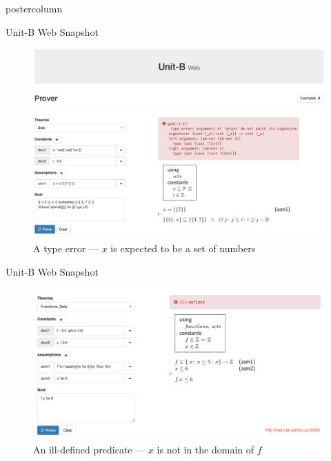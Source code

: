\documentclass{beamer}
\begin{document}
\begin{frame}
\begin{columns}
\begin{column}{.4\textwidth}
\begin{beamercolorbox}[center]{postercolumn}
\begin{minipage}{.98\textwidth}
{\begin{myblock}{Unit-B Web Snapshot}
            \begin{figure}
              \centering\includegraphics[width=\textwidth]{img/unitb-example1.png}
              \caption{A type error --- $x$ is expected to be a set of
                numbers}\label{fig:typechecking}
            \end{figure}
          \end{myblock}
          \begin{myblock}{Unit-B Web Snapshot}
            \begin{figure}
              \begin{minipage}{0.94\textwidth}
                \centering\includegraphics[width=\textwidth]{img/unitb-example2.png}
                \caption{An ill-defined predicate --- $x$ is not in
                  the domain of $f$}\label{fig:wd}
              \end{minipage}
            \end{figure}
          \end{myblock}\vfill
    }\end{minipage}\end{beamercolorbox}

\end{column}
\end{columns}
\end{frame}
\end{document}
